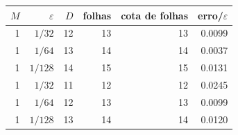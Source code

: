 \begin{tabular}{rrrrrr}
\toprule
$M$ & $\varepsilon$ & $D$ & folhas & cota de folhas & erro/$\varepsilon$\\
\midrule
1 & $1/32$ & 12 & 13 & 13 & 0.0099\\
1 & $1/64$ & 13 & 14 & 14 & 0.0037\\
1 & $1/128$ & 14 & 15 & 15 & 0.0131\\
1 & $1/32$ & 11 & 12 & 12 & 0.0245\\
1 & $1/64$ & 12 & 13 & 13 & 0.0099\\
1 & $1/128$ & 13 & 14 & 14 & 0.0120\\
\bottomrule
\end{tabular}
